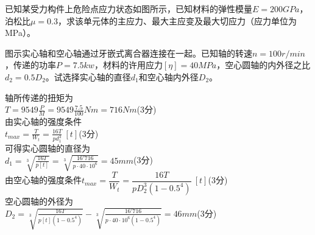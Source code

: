 \documentclass[prescorebox,contitemcnt,answers]{nwsuafexam}%
\begin{document}
\begin{questions}
		\question[20]
		已知某受力构件上危险点应力状态如图所示，已知材料的弹性模量$E=200GPa$，泊松比$\mu=0.3$，求该单元体的主应力、最大主应变及最大切应力（应力单位为MPa）。
		
		\question[15]
		图示实心轴和空心轴通过牙嵌式离合器连接在一起。已知轴的转速$n=100r/min$，传递的功率$P=7.5kw$，材料的许用应力$[\eta]=40MPa$，空心圆轴的内外径之比$d_2=0.5D_2$。试选择实心轴的直径$d_1$和空心轴内外径$D_2$。
		\begin{Answers}[5]
			轴所传递的扭矩为\\
			$T=9549\frac{P}{M}=9549\frac{7.5}{100}Nm=716Nm$\hfill (3分)\\
			由实心轴的强度条件 \\
			$t_{max}=\frac{T}{W_t}=\frac{16T}{pd^3_1}~[t]$\hfill (3分)\\
			可得实心圆轴的直径为 \\
			$d_1=\sqrt[3]{\frac{16T}{p[t]}}=\sqrt[3]{\frac{16'716}{p\cdot 40\cdot 10^6}}=45mm$\hfill (3分)\\
			由空心轴的强度条件$t_{max}=\dfrac{T}{W_t}=\dfrac{16T}{pD^3_2(1-0.5^4)}~[t]$\hfill (3分)\\
			空心圆轴的外径为 \\
			$D_2=\sqrt[3]{\frac{16T}{p[t](1-0.5^4)}}-\sqrt[3]{\frac{16'716}{p\cdot 40\cdot 10^6(1-0.5^4)}}=46mm$\hfill (3分)\\
		\end{Answers}
		\end{questions}
\end{document}
